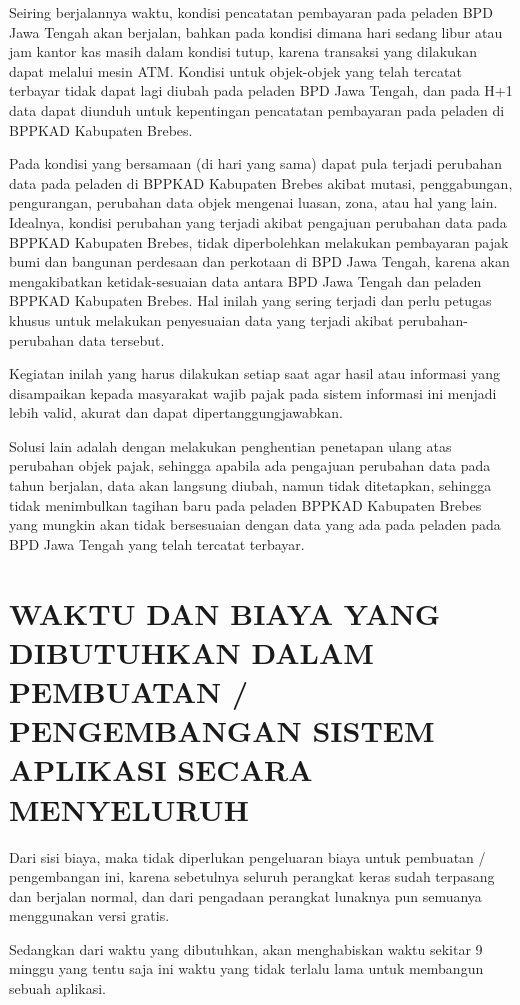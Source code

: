 \documentclass[pdftex,12pt, oneside]{article}
\begin{document}
Seiring berjalannya waktu, kondisi pencatatan pembayaran pada peladen BPD Jawa Tengah akan berjalan, bahkan pada kondisi dimana hari sedang libur atau jam kantor kas masih dalam kondisi tutup, karena transaksi yang dilakukan dapat melalui mesin ATM. Kondisi untuk objek-objek yang telah tercatat terbayar tidak dapat lagi diubah pada peladen BPD Jawa Tengah, dan pada H+1 data dapat diunduh untuk kepentingan pencatatan pembayaran pada peladen di BPPKAD Kabupaten Brebes.

Pada kondisi yang bersamaan (di hari yang sama) dapat pula terjadi perubahan data pada peladen di BPPKAD Kabupaten Brebes akibat mutasi, penggabungan, pengurangan, perubahan data objek mengenai luasan, zona, atau hal yang lain. Idealnya, kondisi perubahan yang terjadi akibat pengajuan perubahan data pada BPPKAD Kabupaten Brebes, tidak diperbolehkan melakukan pembayaran pajak bumi dan bangunan perdesaan dan perkotaan di BPD Jawa Tengah, karena akan mengakibatkan ketidak-sesuaian data antara BPD Jawa Tengah dan peladen BPPKAD Kabupaten Brebes. Hal inilah yang sering terjadi dan perlu petugas khusus untuk melakukan penyesuaian data yang terjadi akibat perubahan-perubahan data tersebut.

Kegiatan inilah yang harus dilakukan setiap saat agar hasil atau informasi yang disampaikan kepada masyarakat wajib pajak pada sistem informasi ini menjadi lebih valid, akurat dan dapat dipertanggungjawabkan.

Solusi lain adalah dengan melakukan penghentian penetapan ulang atas perubahan objek pajak, sehingga apabila ada pengajuan perubahan data pada tahun berjalan, data akan langsung diubah, namun tidak ditetapkan, sehingga tidak menimbulkan tagihan baru pada peladen BPPKAD Kabupaten Brebes yang mungkin akan tidak bersesuaian dengan data yang ada pada peladen pada BPD Jawa Tengah yang telah tercatat terbayar.

\section{WAKTU DAN BIAYA YANG DIBUTUHKAN DALAM PEMBUATAN / PENGEMBANGAN SISTEM APLIKASI SECARA MENYELURUH}

Dari sisi biaya, maka tidak diperlukan pengeluaran biaya untuk pembuatan / pengembangan ini, karena sebetulnya seluruh perangkat keras sudah terpasang dan berjalan normal, dan dari pengadaan perangkat lunaknya pun semuanya menggunakan versi gratis.

Sedangkan dari waktu yang dibutuhkan, akan menghabiskan waktu sekitar 9 minggu yang tentu saja ini waktu yang tidak terlalu lama untuk membangun sebuah aplikasi.
\end{document}
